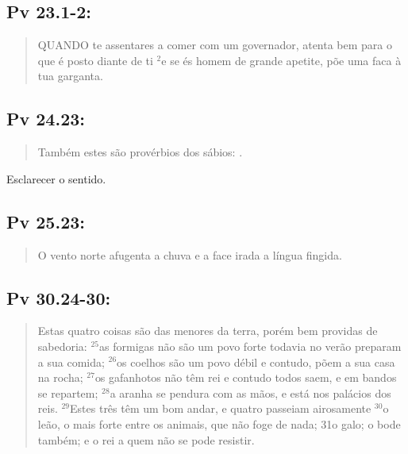 \subsection*{Pv 23.1-2:} 
 \begin{quote} 
 \small
 QUANDO te assentares a comer com um governador, atenta bem para o que é posto diante de ti\uwave{,} $^{\mathrm{2}}$e se és homem de grande apetite, põe uma faca à tua garganta.
\end{quote}

\subsection*{Pv 24.23:} 
 \begin{quote}
  \small
 Também estes são provérbios dos sábios: .
 \end{quote}
 
Esclarecer o sentido.

\subsection*{Pv 25.23:} 
 \begin{quote}
  \small
 O vento norte afugenta a chuva\uwave{,} e a face irada\uwave{,} a língua fingida.
\end{quote}

\subsection*{Pv 30.24-30:} 
 \begin{quote}
  \small
 Estas quatro coisas são das menores da terra, porém bem providas de sabedoria: $^{\mathrm{25}}$as formigas não são um povo forte\uwave{;} todavia no verão preparam a sua comida; $^{\mathrm{26}}$os coelhos são um povo débil\uwave{;} e contudo, põem a sua casa na rocha; $^{\mathrm{27}}$os gafanhotos não têm rei\uwave{;} e contudo todos saem, e em bandos se repartem; $^{\mathrm{28}}$a aranha se pendura com as mãos, e está nos palácios dos reis. $^{\mathrm{29}}$Estes três têm um bom andar, e quatro passeiam airosamente\uwave{;} $^{\mathrm{30}}$o leão, o mais forte entre os animais, que não foge de nada; 31o galo; o bode também; e o rei a quem não se pode resistir.
\end{quote}

